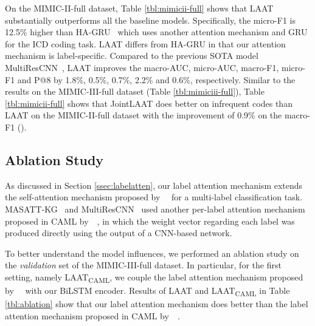 \documentclass{article}
\begin{document}
On the MIMIC-II-full dataset,  Table \ref{tbl:mimicii-full} shows that LAAT substantially outperforms all the baseline models. Specifically, the micro-F1 is 12.5\% higher than HA-GRU~\cite{baumel2018multi} which uses another attention mechanism and GRU for the ICD coding task. LAAT differs from HA-GRU in that our attention mechanism is label-specific.  Compared to the previous SOTA model MultiResCNN~\cite{li2020multirescnn}, LAAT improves the macro-AUC, micro-AUC, macro-F1, micro-F1 and P@8 by 1.8\%, 0.5\%, 0.7\%, 2.2\% and 0.6\%, respectively. Similar to the results on the MIMIC-III-full dataset (Table \ref{tbl:mimiciii-full}), Table \ref{tbl:mimicii-full} shows that JointLAAT does better on infrequent codes than LAAT on the MIMIC-II-full dataset with the improvement of 0.9\% on the macro-F1 (). 























\subsection{Ablation Study} 
As discussed in Section \ref{ssec:labelatten}, our label attention mechanism extends the  self-attention mechanism proposed by~\citeauthor{lin2017}~ for a multi-label classification task. 
MASATT-KG~\cite{xie2019ehr} and MultiResCNN~\cite{li2020multirescnn} used another per-label attention mechanism proposed in CAML  by~\citeauthor{mullenbach2018}~, in which the weight vector regarding each label was produced directly using the output of a CNN-based network. 

To better understand the model influences, we performed an ablation study on the \emph{validation} set of the MIMIC-III-full dataset. In particular, for the first setting, namely LAAT\textsubscript{CAML}, we couple the label attention mechanism proposed by~\citeauthor{mullenbach2018}~ with our BiLSTM encoder. Results of LAAT and LAAT\textsubscript{CAML} in Table \ref{tbl:ablation} show that our label attention mechanism does  better than the label attention mechanism proposed in CAML  by~\citeauthor{mullenbach2018}~. 
\end{document}
